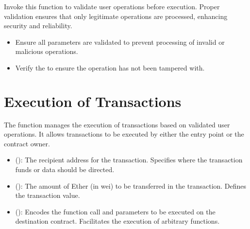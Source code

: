 \documentclass[a4paper,10pt,english]{sphinxmanual}
\begin{document}
\sphinxAtStartPar
{}

\sphinxAtStartPar
Invoke this function to validate user operations before execution. Proper validation ensures that only legitimate operations are processed, enhancing security and reliability.

\sphinxAtStartPar
{}
\begin{itemize}
\item {} 
\sphinxAtStartPar
{} Ensure all parameters are validated to prevent processing of invalid or malicious operations.

\item {} 
\sphinxAtStartPar
{} Verify the  to ensure the operation has not been tampered with.

\end{itemize}


\section{Execution of Transactions}
\label{\detokenize{docs_minimal_account_abstraction:execution-of-transactions}}
\sphinxAtStartPar
The  function manages the execution of transactions based on validated user operations. It allows transactions to be executed by either the entry point or the contract owner.

\sphinxAtStartPar
{}
\begin{itemize}
\item {} 
\sphinxAtStartPar
{} ():
The recipient address for the transaction. Specifies where the transaction funds or data should be directed.

\item {} 
\sphinxAtStartPar
{} ():
The amount of Ether (in wei) to be transferred in the transaction. Defines the transaction value.

\item {} 
\sphinxAtStartPar
{} ():
Encodes the function call and parameters to be executed on the destination contract. Facilitates the execution of arbitrary functions.

\end{itemize}
\end{document}
